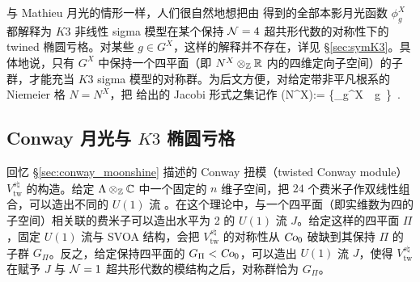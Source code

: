与 Mathieu 月光的情形一样，人们很自然地想把由  得到的全部本影月光函数 $\phi_g^{X}$ 都解释为 $K3$ 非线性 sigma 模型在某个保持 ${\cal N}=4$ 超共形代数的对称性下的 twined 椭圆亏格。对某些 $g\in G^X$，这样的解释并不存在，详见 \S\ref{sec:symK3}。具体地说，只有 $G^X$ 中保持一个四平面（即 $N^X\otimes_{\mathbb{Z}} \mathbb{R}$ 内的四维定向子空间）的子群，才能充当 $K3$ sigma 模型的对称群。为后文方便，对给定带非平凡根系的 Niemeier 格 $N=N^X$，把  给出的 Jacobi 形式之集记作
\be\label{def:umset}
\Phi(N^X):= \{\phi_g^X~\lvert~g~{}\}~.\ee

\subsection{Conway 月光与 $K3$ 椭圆亏格}
\label{subsec:conwayK3}

回忆 \S \ref{sec:conway_moonshine} 描述的 Conway 扭模（twisted Conway module）$V_{\text{tw}}^{s\natural}$ 的构造。给定 $\Lambda \otimes_{\mathbb{Z}} \mathbb{C}$ 中一个固定的 $n$ 维子空间，把 $24$ 个费米子作双线性组合，可以造出不同的 $U(1)$ 流 \cite{Cheng:2014owa,MR3465528}。在这个理论中，与一个四平面（即实维数为四的子空间）相关联的费米子可以造出水平为 2 的 $U(1)$ 流 $J$。给定这样的四平面 $\Pi$，固定 $U(1)$ 流与 SVOA 结构，会把 $V^{s\natural}_{\text{tw}}$ 的对称性从 $\operatorname{\textsl{Co}}_0$ 破缺到其保持 $\Pi$ 的子群 $G_\Pi$。反之，给定保持四平面的 $G_\Pi< \operatorname{\textsl{Co}}_0$，可以造出 $U(1)$ 流 $J$，使得 $V^{s\natural}_{\text{tw}}$ 在赋予 $J$ 与 ${\cal N}=1$ 超共形代数的模结构之后，对称群恰为 $G_\Pi$。


